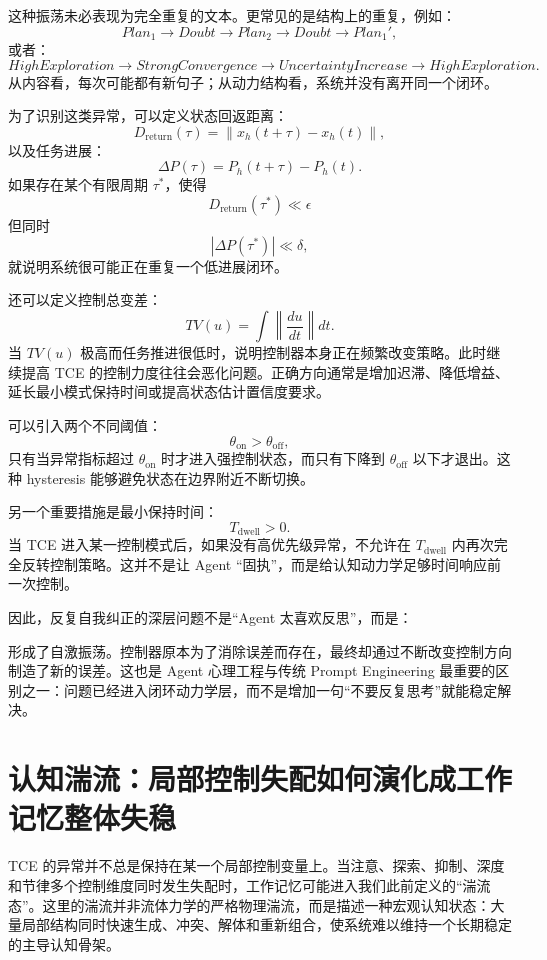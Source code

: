 这种振荡未必表现为完全重复的文本。更常见的是结构上的重复，例如：
\[
Plan_1
\rightarrow
Doubt
\rightarrow
Plan_2
\rightarrow
Doubt
\rightarrow
Plan_1',
\]
或者：
\[
HighExploration
\rightarrow
StrongConvergence
\rightarrow
UncertaintyIncrease
\rightarrow
HighExploration.
\]
从内容看，每次可能都有新句子；从动力结构看，系统并没有离开同一个闭环。

为了识别这类异常，可以定义状态回返距离：
\[
D_{\mathrm{return}}(\tau)
=
\|x_h(t+\tau)-x_h(t)\|,
\]
以及任务进展：
\[
\Delta P(\tau)
=
P_h(t+\tau)-P_h(t).
\]
如果存在某个有限周期 \(\tau^\ast\)，使得
\[
D_{\mathrm{return}}(\tau^\ast)\ll \epsilon
\]
但同时
\[
|\Delta P(\tau^\ast)|\ll\delta,
\]
就说明系统很可能正在重复一个低进展闭环。

还可以定义控制总变差：
\[
TV(u)
=
\int
\left\|
\frac{du}{dt}
\right\|dt.
\]
当 \(TV(u)\) 极高而任务推进很低时，说明控制器本身正在频繁改变策略。此时继续提高 TCE 的控制力度往往会恶化问题。正确方向通常是增加迟滞、降低增益、延长最小模式保持时间或提高状态估计置信度要求。

可以引入两个不同阈值：
\[
\theta_{\mathrm{on}}
>
\theta_{\mathrm{off}},
\]
只有当异常指标超过 \(\theta_{\mathrm{on}}\) 时才进入强控制状态，而只有下降到 \(\theta_{\mathrm{off}}\) 以下才退出。这种 hysteresis 能够避免状态在边界附近不断切换。

另一个重要措施是最小保持时间：
\[
T_{\mathrm{dwell}}>0.
\]
当 TCE 进入某一控制模式后，如果没有高优先级异常，不允许在 \(T_{\mathrm{dwell}}\) 内再次完全反转控制策略。这并不是让 Agent “固执”，而是给认知动力学足够时间响应前一次控制。

因此，反复自我纠正的深层问题不是“Agent 太喜欢反思”，而是：
\begin{statementbox}
\centering
{}
\end{statementbox}
形成了自激振荡。控制器原本为了消除误差而存在，最终却通过不断改变控制方向制造了新的误差。这也是 Agent 心理工程与传统 Prompt Engineering 最重要的区别之一：问题已经进入闭环动力学层，而不是增加一句“不要反复思考”就能稳定解决。

\section{认知湍流：局部控制失配如何演化成工作记忆整体失稳}

TCE 的异常并不总是保持在某一个局部控制变量上。当注意、探索、抑制、深度和节律多个控制维度同时发生失配时，工作记忆可能进入我们此前定义的“湍流态”。这里的湍流并非流体力学的严格物理湍流，而是描述一种宏观认知状态：大量局部结构同时快速生成、冲突、解体和重新组合，使系统难以维持一个长期稳定的主导认知骨架。

